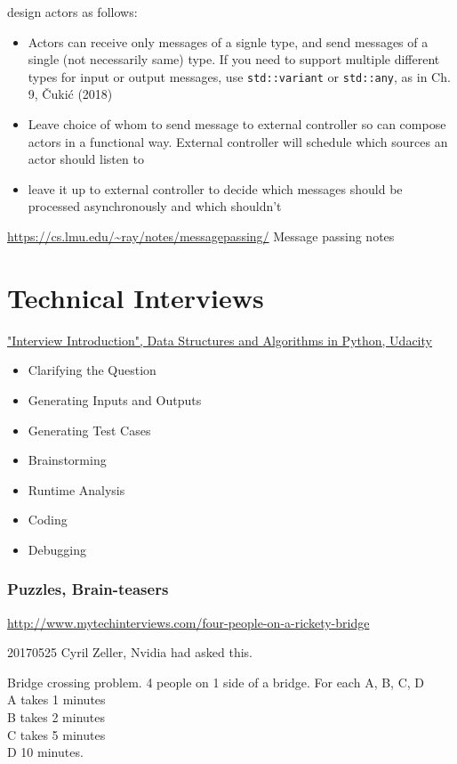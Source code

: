 \documentclass[10pt]{amsart}
\begin{document}
design actors as follows:

\begin{itemize}
	\item Actors can receive only messages of a signle type, and send messages of a single (not necessarily same) type. If you need to support multiple different types for input or output messages, use \verb|std::variant| or \verb|std::any|, as in Ch. 9, \v{C}uki\'{c} (2018) \cite{Cuki2008}
	\item Leave choice of whom to send message to external controller so can compose actors in a functional way. External controller will schedule which sources an actor should listen to
	\item leave it up to external controller to decide which messages should be processed asynchronously and which shouldn't
\end{itemize}

\url{https://cs.lmu.edu/~ray/notes/messagepassing/} Message passing notes
	
\part{Technical Interviews}

\href{https://classroom.udacity.com/courses/ud513/lessons/7707710408/concepts/77114606610923}{"Interview Introduction", Data Structures and Algorithms in Python, Udacity}

\begin{itemize}
	\item Clarifying the Question
	\item Generating Inputs and Outputs
	\item Generating Test Cases
	\item Brainstorming
	\item Runtime Analysis
	\item Coding
	\item Debugging
\end{itemize}

\section{Puzzles, Brain-teasers}

\url{http://www.mytechinterviews.com/four-people-on-a-rickety-bridge}

20170525 Cyril Zeller, Nvidia had asked this.

Bridge crossing problem. 4 people on 1 side of a bridge. For each A, B, C, D \\
A takes 1 minutes \\
B takes 2 minutes \\
C takes 5 minutes \\
D 10 minutes. \\
\end{document}
